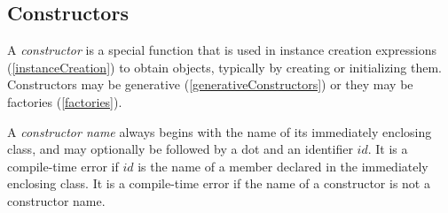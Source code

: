 \documentclass{article}
\newcommand{\code}[1]{{\sf #1}}
\begin{document}








\subsection{Constructors}

\LMHash{}
A {\em constructor} is a special function that is used in instance creation expressions (\ref{instanceCreation}) to obtain objects, typically by creating or initializing them.
Constructors may be generative (\ref{generativeConstructors}) or they may be factories (\ref{factories}).

\LMHash{}
A {\em constructor name} always begins with the name of its immediately enclosing class, and may optionally be followed by a dot and an identifier $id$. It is a compile-time error if $id$ is the name of a member  declared in the immediately enclosing class. It is a compile-time error if the name of a  constructor is not a constructor name.



\end{document}
